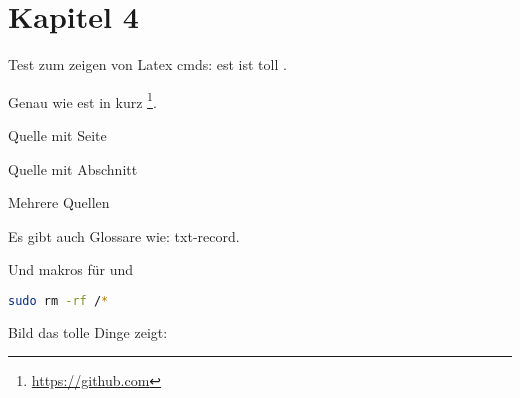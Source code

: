 \chapter{Kapitel 4}
\label{chap:4}

Test zum zeigen von Latex cmds: \gls{est} ist toll \cite{rfc9000}.

Genau wie \gls{est} in kurz
\footnote{\url{https://github.com}}.

Quelle mit Seite \cite[10]{rfc9000}

Quelle mit Abschnitt \cite[Abschnitt 2]{rfc9000}

Mehrere Quellen \cite{rfc9000, rfc9000, rfc9000, rfc9000}


Es gibt auch Glossare wie: \gls{txt-record}.

Und makros für 
und \zb {}

\vspace{\baselineskip}

\begin{lstlisting}[language=bash, caption=Toller Befehl oder Code, label=lst:cmd]
 sudo rm -rf /*
\end{lstlisting}

Bild das tolle Dinge zeigt\proof:


